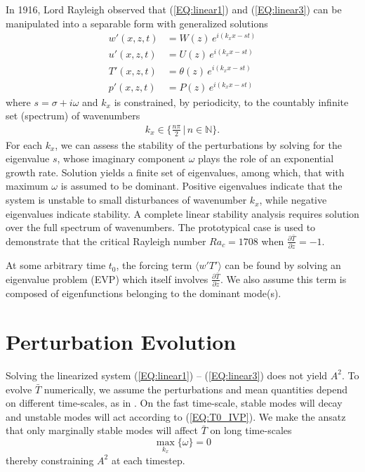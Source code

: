 \documentclass[reprint,amsmath,amssymb,aps]{revtex4-1}
\begin{document}
In 1916, Lord Rayleigh observed that (\ref{EQ:linear1}) and (\ref{EQ:linear3}) can be manipulated into a separable form with generalized solutions
\begin{align}
    w'(x, z, t) &= W(z) \, e^{i(k_xx-st)} \label{EQ:normal_modes1}\\ 
    u'(x, z, t) &= U(z) \, e^{i(k_xx-st)} \label{EQ:normal_modes2}\\ 
    T'(x, z, t) &= \theta(z) \, e^{i(k_xx-st)} \label{EQ:normal_modes3}\\ 
    p'(x, z, t) &= P(z) \, e^{i(k_xx-st)}\label{EQ:normal_modes4}
\end{align}
where $s = \sigma + i\omega$ and $k_x$ is constrained, by periodicity, to the countably infinite set (spectrum) of wavenumbers
\begin{align}
    k_x \in \big\{\frac{n\pi}{2} \, \big| \, n \in \mathbb{N}\big\}.
\end{align}
For each $k_x$, we can assess the stability of the perturbations by solving for the eigenvalue $s$, whose imaginary component $\omega$ plays the role of an exponential growth rate. 
Solution yields a finite set of eigenvalues, among which, that with maximum $\omega$ is assumed to be dominant. 
Positive eigenvalues indicate that the system is unstable to small disturbances of wavenumber $k_x$, while negative eigenvalues indicate stability. 
A complete linear stability analysis requires solution over the full spectrum of wavenumbers. 
The prototypical case is used to demonstrate that the critical Rayleigh number $Ra_c = 1708$ when $\frac{\partial \bar{T}}{\partial z} = -1$.
 
At some arbitrary time $t_0$, the forcing term $\langle w'T' \rangle$ can be found by solving an eigenvalue problem (EVP) which itself involves $\frac{\partial \bar{T}}{\partial z}$. 
We also assume this term is composed of eigenfunctions belonging to the dominant mode(s). 

\section{Perturbation Evolution}
Solving the linearized system (\ref{EQ:linear1}) -- (\ref{EQ:linear3}) does not yield $A^2$. 
To evolve $\bar{T}$ numerically, we assume the perturbations and mean quantities depend on different time-scales, as in \cite{michel_chini_2019}. On the fast time-scale, stable modes will decay and unstable modes will act according to (\ref{EQ:T0_IVP}). 
We make the ansatz that only marginally stable modes will affect $\bar{T}$ on long time-scales
\begin{equation}
    \max_{k_x} \{ \omega \} = 0
\end{equation}
thereby constraining $A^2$ at each timestep.
\end{document}
